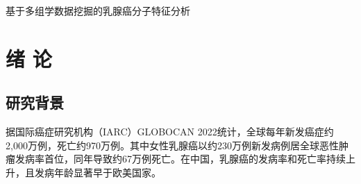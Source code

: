 \documentclass[12pt,a4paper,openany]{ctexbook}
\begin{document}


\setcounter{page}{1}

\begin{center}
{\heiti\Large 基于多组学数据挖掘的乳腺癌分子特征分析}
\end{center}
\vspace{2em}
\begin{abstract}
\noindent 乳腺癌是全球发病率最高的恶性肿瘤，其分子异质性是精准诊疗面临的核心挑战。本研究基于TCGA-BRCA多组学数据（mRNA转录组25,981个基因、miRNA表达谱1,881个、体细胞突变15,413个基因及临床注释94项），对1,076例多组学共同患者进行了系统性的数据挖掘分析。研究综合运用DESeq2差异表达分析、LASSO和随机森林分类、PCA/t-SNE聚类、WGCNA共表达网络、Cox比例风险回归、maftools突变景观分析、g:Profiler功能富集分析、arules关联规则挖掘及ConsensusClusterPlus共识聚类等算法。主要结果包括：鉴定6,768个显著差异表达基因（$|\log_2\text{FC}|>1$, FDR$<0.05$），其中上调4,334个、下调2,434个；LASSO分类器以89.4\%准确率实现三分类分子亚型预测，仅使用35个基因；WGCNA识别8个有效共表达模块（另含grey未分配基因集），blue模块枢纽基因模块隶属度达0.959；多变量Cox模型C-index为0.771，Stage IV风险比达30.36（95\%CI: 9.87--93.45）；PIK3CA（37.3\%）和TP53（35.2\%）为最高频突变基因；功能富集揭示上调基因显著富集于细胞周期通路（Reactome Cell Cycle, 187个基因, $p=1.5\times10^{-21}$）。本研究为乳腺癌多组学数据挖掘提供了完整分析框架。

\vspace{1em}
\vspace{1em}：乳腺癌；TCGA；多组学数据挖掘；差异表达分析；WGCNA；预后模型
\end{abstract}

\newpage
\tableofcontents
\newpage
\renewcommand{\listfigurename}{图目录}
\listoffigures
\newpage
\renewcommand{\listtablename}{表目录}
\listoftables
\newpage
{}
\setcounter{page}{1}
\chapter{绪 论}

\section{研究背景}
据国际癌症研究机构（IARC）GLOBOCAN 2022统计，全球每年新发癌症约2,000万例，死亡约970万例\cite{sung2024global}。其中女性乳腺癌以约230万例新发病例居全球恶性肿瘤发病率首位，同年导致约67万例死亡。在中国，乳腺癌的发病率和死亡率持续上升，且发病年龄显著早于欧美国家。
\end{document}
